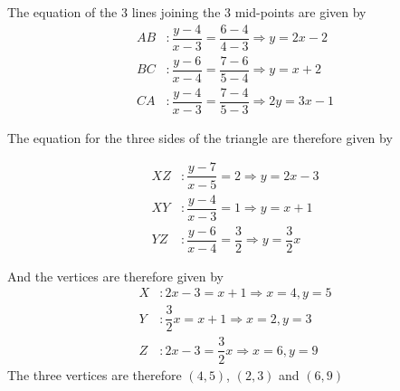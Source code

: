 \begin{solution}[\fullpage]
	The equation of the 3 lines joining the 3 mid-points are given by
	\begin{align}
		AB &: \dfrac{y-4}{x-3} = \dfrac{6-4}{4-3} \Rightarrow y = 2x - 2 \\
		BC &: \dfrac{y-6}{x-4} = \dfrac{7-6}{5-4} \Rightarrow y = x + 2 \\
		CA &: \dfrac{y-4}{x-3} = \dfrac{7-4}{5-3} \Rightarrow 2y = 3x - 1
	\end{align}
	
	The equation for the three sides of the triangle are therefore given by
	
	\begin{align}
		XZ &: \dfrac{y-7}{x-5} = 2 \Rightarrow y = 2x - 3 \\
		XY &: \dfrac{y-4}{x-3} = 1 \Rightarrow y = x + 1 \\
		YZ &: \dfrac{y-6}{x-4} = \dfrac{3}{2} \Rightarrow y = \dfrac{3}{2}x
	\end{align}
	
	And the vertices are therefore given by
	\begin{align}
		X &: 2x-3 = x + 1 \Rightarrow x = 4, y = 5 \\
		Y &: \dfrac{3}{2}x = x + 1 \Rightarrow x = 2, y = 3 \\
		Z &: 2x-3 = \dfrac{3}{2}x \Rightarrow x = 6, y = 9
	\end{align}
	The three vertices are therefore $(4,5)$, $(2,3)$ and $(6,9)$
	
	
	
	
	
\end{solution}
